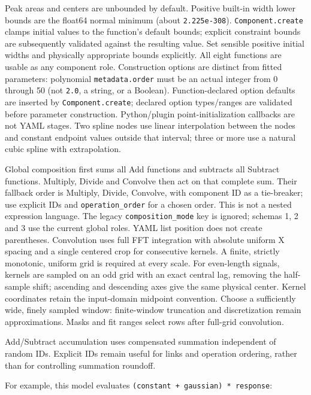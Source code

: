 \documentclass[
  10pt,
  a4paper,
  oneside]{scrreprt}
\begin{document}
Peak areas and centers are unbounded by default. Positive built-in width
lower bounds are the float64 normal minimum (about \texttt{2.225e-308}).
\texttt{Component.create} clamps initial values to the function's
default bounds; explicit constraint bounds are subsequently validated
against the resulting value. Set sensible positive initial widths and
physically appropriate bounds explicitly. All eight functions are usable
as any component role. Construction options are distinct from fitted
parameters: polynomial \texttt{metadata.order} must be an actual integer
from 0 through 50 (not \texttt{2.0}, a string, or a Boolean).
Function-declared option defaults are inserted by
\texttt{Component.create}; declared option types/ranges are validated
before parameter construction. Python/plugin point-initialization
callbacks are not YAML stages. Two spline nodes use linear interpolation
between the nodes and constant endpoint values outside that interval;
three or more use a natural cubic spline with extrapolation.

Global composition first sums all Add functions and subtracts all
Subtract functions. Multiply, Divide and Convolve then act on that
complete sum. Their fallback order is Multiply, Divide, Convolve, with
component ID as a tie-breaker; use explicit IDs and
\texttt{operation\_order} for a chosen order. This is not a nested
expression language. The legacy \texttt{composition\_mode} key is
ignored; schemas 1, 2 and 3 use the current global roles. YAML list
position does not create parentheses. Convolution uses full FFT
integration with absolute uniform X spacing and a single centered crop
for consecutive kernels. A finite, strictly monotonic, uniform grid is
required at every scale. For even-length signals, kernels are sampled on
an odd grid with an exact central lag, removing the half-sample shift;
ascending and descending axes give the same physical center. Kernel
coordinates retain the input-domain midpoint convention. Choose a
sufficiently wide, finely sampled window: finite-window truncation and
discretization remain approximations. Masks and fit ranges select rows
after full-grid convolution.

Add/Subtract accumulation uses compensated summation independent of
random IDs. Explicit IDs remain useful for links and operation ordering,
rather than for controlling summation roundoff.

For example, this model evaluates
\texttt{(constant\ +\ gaussian)\ *\ response}:
\end{document}
